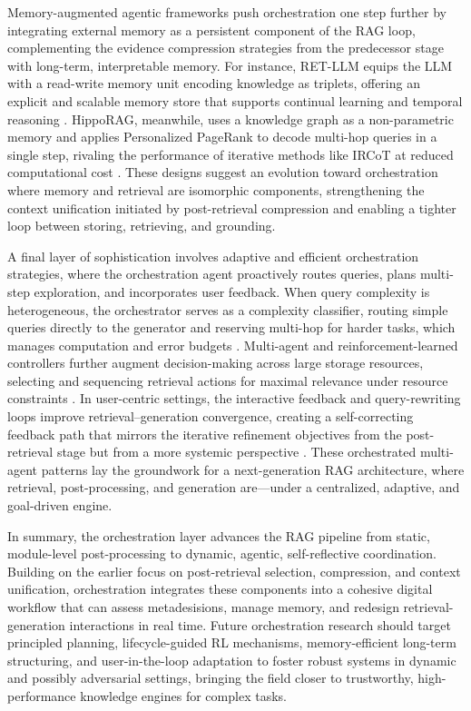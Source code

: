 \documentclass[11pt,a4paper]{article}
\begin{document}
Memory-augmented agentic frameworks push orchestration one step further by integrating external memory as a persistent component of the RAG loop, complementing the evidence compression strategies from the predecessor stage with long-term, interpretable memory. For instance, RET-LLM equips the LLM with a read-write memory unit encoding knowledge as triplets, offering an explicit and scalable memory store that supports continual learning and temporal reasoning \cite{arxiv:2402.07483v1}. HippoRAG, meanwhile, uses a knowledge graph as a non-parametric memory and applies Personalized PageRank to decode multi-hop queries in a single step, rivaling the performance of iterative methods like IRCoT at reduced computational cost \cite{arxiv:2402.13547v1}. These designs suggest an evolution toward orchestration where memory and retrieval are isomorphic components, strengthening the context unification initiated by post-retrieval compression and enabling a tighter loop between storing, retrieving, and grounding.

A final layer of sophistication involves adaptive and efficient orchestration strategies, where the orchestration agent proactively routes queries, plans multi-step exploration, and incorporates user feedback. When query complexity is heterogeneous, the orchestrator serves as a complexity classifier, routing simple queries directly to the generator and reserving multi-hop for harder tasks, which manages computation and error budgets \cite{arxiv:2404.17347v1}. Multi-agent and reinforcement-learned controllers further augment decision-making across large storage resources, selecting and sequencing retrieval actions for maximal relevance under resource constraints \cite{arxiv:2404.14600v1}. In user-centric settings, the interactive feedback and query-rewriting loops improve retrieval--generation convergence, creating a self-correcting feedback path that mirrors the iterative refinement objectives from the post-retrieval stage but from a more systemic perspective \cite{arxiv:2305.14283v3}. These orchestrated multi-agent patterns lay the groundwork for a next-generation RAG architecture, where retrieval, post-processing, and generation are---under a centralized, adaptive, and goal-driven engine.

In summary, the orchestration layer advances the RAG pipeline from static, module-level post-processing to dynamic, agentic, self-reflective coordination. Building on the earlier focus on post-retrieval selection, compression, and context unification, orchestration integrates these components into a cohesive digital workflow that can assess metadesisions, manage memory, and redesign retrieval-generation interactions in real time. Future orchestration research should target principled planning, lifecycle-guided RL mechanisms, memory-efficient long-term structuring, and user-in-the-loop adaptation to foster robust systems in dynamic and possibly adversarial settings, bringing the field closer to trustworthy, high-performance knowledge engines for complex tasks.
\end{document}
